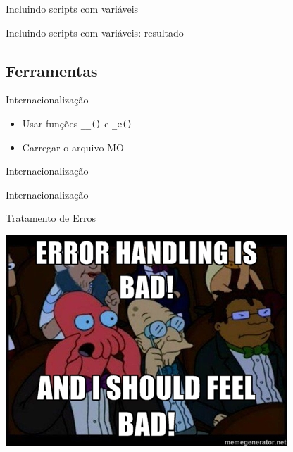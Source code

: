 \documentclass{beamer}
\begin{document}
\begin{frame}{Incluindo scripts com variáveis}
  \pause 
\end{frame}

\begin{frame}{Incluindo scripts com variáveis: resultado}
  
\end{frame}

\subsection{Ferramentas}

\begin{frame}\end{frame}

\begin{frame}{Internacionalização}
\begin{itemize}
  \pause \item Usar funções \texttt{\_\_()} e \texttt{\_e()}
  \pause \item Carregar o arquivo MO
\end{itemize}
\end{frame}

\begin{frame}{Internacionalização}
  
\end{frame}

\begin{frame}{Internacionalização}
  
\end{frame}

\begin{frame}{Tratamento de Erros}
\begin{center}
  \includegraphics[height=0.8\textheight]{./img/error-handling.jpg}
\end{center}
\end{frame}
\end{document}
